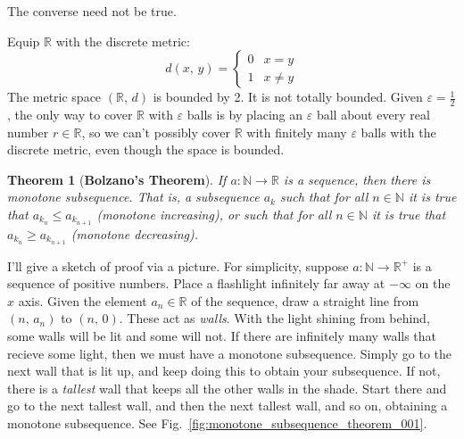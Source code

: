 \documentclass{article}
\theoremstyle{plain}
\newtheorem{theorem}{Theorem}[section]
\theoremstyle{normal}
\newenvironment{example}{%
    \pushQED{\qed}\renewcommand{\qedsymbol}{$\blacksquare$}\examplex%
}{%
    \popQED\endexamplex%
}
\begin{document}
        The converse need not be true.
        \begin{example}
            Equip $\mathbb{R}$ with the discrete metric:
            \begin{equation}
                d(x,\,y)=
                \begin{cases}
                    0&x=y\\
                    1&x\ne{y}
                \end{cases}
            \end{equation}
            The metric space $(\mathbb{R},\,d)$ is bounded by 2. It is not
            totally bounded. Given $\varepsilon=\frac{1}{2}$, the only way
            to cover $\mathbb{R}$ with $\varepsilon$ balls is by placing an
            $\varepsilon$ ball about every real number $r\in\mathbb{R}$, so
            we can't possibly cover $\mathbb{R}$ with finitely many
            $\varepsilon$ balls with the discrete metric, even though the
            space is bounded.
        \end{example}
        \begin{theorem}[\textbf{Bolzano's Theorem}]
            If $a:\mathbb{N}\rightarrow\mathbb{R}$ is a sequence, then there
            is monotone subsequence. That is, a subsequence $a_{k}$ such that
            for all $n\in\mathbb{N}$ it is true that
            $a_{k_{n}}\leq{a}_{k_{n+1}}$ (monotone increasing), or such that
            for all $n\in\mathbb{N}$ it is true that
            $a_{k_{n}}\geq{a}_{k_{n+1}}$ (monotone decreasing).
        \end{theorem}
        I'll give a sketch of proof via a picture. For simplicity, suppose
        $a:\mathbb{N}\rightarrow\mathbb{R}^{+}$ is a sequence of positive
        numbers. Place a flashlight infinitely far away at $-\infty$ on the
        $x$ axis. Given the element $a_{n}\in\mathbb{R}$ of the sequence,
        draw a straight line from $(n,\,a_{n})$ to $(n,\,0)$. These act as
        \textit{walls}. With the light shining from behind, some walls will
        be lit and some will not. If there are infinitely many walls that
        recieve some light, then we must have a monotone subsequence. Simply
        go to the next wall that is lit up, and keep doing this to obtain
        your subsequence. If not, there is a \textit{tallest} wall that keeps
        all the other walls in the shade. Start there and go to the next
        tallest wall, and then the next tallest wall, and so on, obtaining a
        monotone subsequence. See
        Fig.~\ref{fig:monotone_subsequence_theorem_001}.
\end{document}

